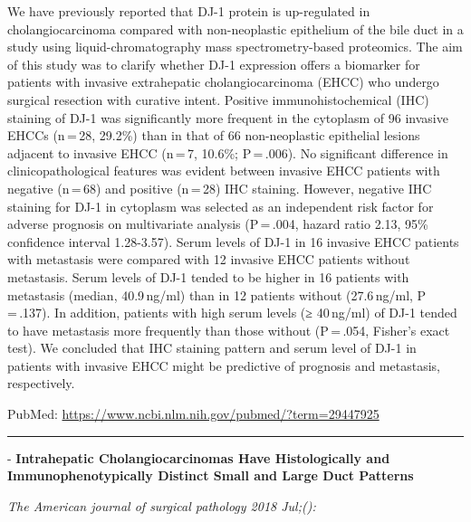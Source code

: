 \documentclass[]{article}
\begin{document}
We have previously reported that DJ-1 protein is up-regulated in
cholangiocarcinoma compared with non-neoplastic epithelium of the bile
duct in a study using liquid-chromatography mass spectrometry-based
proteomics. The aim of this study was to clarify whether DJ-1 expression
offers a biomarker for patients with invasive extrahepatic
cholangiocarcinoma (EHCC) who undergo surgical resection with curative
intent. Positive immunohistochemical (IHC) staining of DJ-1 was
significantly more frequent in the cytoplasm of 96 invasive EHCCs
(n\,=\,28, 29.2\%) than in that of 66 non-neoplastic epithelial lesions
adjacent to invasive EHCC (n\,=\,7, 10.6\%; P\,=\,.006). No significant
difference in clinicopathological features was evident between invasive
EHCC patients with negative (n\,=\,68) and positive (n\,=\,28) IHC
staining. However, negative IHC staining for DJ-1 in cytoplasm was
selected as an independent risk factor for adverse prognosis on
multivariate analysis (P\,=\,.004, hazard ratio 2.13, 95\% confidence
interval 1.28-3.57). Serum levels of DJ-1 in 16 invasive EHCC patients
with metastasis were compared with 12 invasive EHCC patients without
metastasis. Serum levels of DJ-1 tended to be higher in 16 patients with
metastasis (median, 40.9\,ng/ml) than in 12 patients without
(27.6\,ng/ml, P\,=\,.137). In addition, patients with high serum levels
(≥ 40\,ng/ml) of DJ-1 tended to have metastasis more frequently than
those without (P\,=\,.054, Fisher's exact test). We concluded that IHC
staining pattern and serum level of DJ-1 in patients with invasive EHCC
might be predictive of prognosis and metastasis, respectively.

PubMed: \url{https://www.ncbi.nlm.nih.gov/pubmed/?term=29447925}

{}

{}

\begin{center}\rule{0.5\linewidth}{\linethickness}\end{center}

 - \textbf{Intrahepatic Cholangiocarcinomas Have Histologically and
Immunophenotypically Distinct Small and Large Duct Patterns}

\emph{The American journal of surgical pathology 2018 Jul;():}
\end{document}
